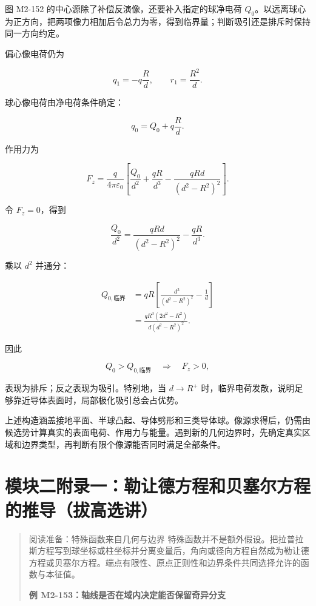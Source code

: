 图 M2-152 的中心源除了补偿反演像，还要补入指定的球净电荷
\(Q_0\)。以远离球心为正方向，把两项像力相加后令总力为零，得到临界量；判断吸引还是排斥时保持同一方向约定。

偏心像电荷仍为

\[
q_1=-q\frac{R}{d},
\qquad
r_1=\frac{R^2}{d}.
\]

球心像电荷由净电荷条件确定：

\[
q_0=Q_0+q\frac{R}{d}.
\]

作用力为

\[
F_z
=\frac{q}{4\pi\varepsilon_0}
\left[
\frac{Q_0}{d^2}
+\frac{qR}{d^3}
-\frac{qRd}{(d^2-R^2)^2}
\right].
\]

令 \(F_z=0\)，得到

\[
\frac{Q_0}{d^2}
=\frac{qRd}{(d^2-R^2)^2}
-\frac{qR}{d^3}.
\]

乘以 \(d^2\) 并通分：

\[
\begin{aligned}
Q_{0,\text{临界}}
&=qR\left[
\frac{d^3}{(d^2-R^2)^2}-\frac1d
\right]\\
&=\boxed{
\frac{qR^3(2d^2-R^2)}{d(d^2-R^2)^2}
}.
\end{aligned}
\]

因此

\[
Q_0>Q_{0,\text{临界}}
\quad\Longrightarrow\quad
F_z>0,
\]

表现为排斥；反之表现为吸引。特别地，当 \(d\to R^+\)
时，临界电荷发散，说明足够靠近导体表面时，局部极化吸引总会占优势。

上述构造涵盖接地平面、半球凸起、导体劈形和三类导体球。像源求得后，仍需由候选势计算真实的表面电荷、作用力与能量。遇到新的几何边界时，先确定真实区域和边界类型，再判断有限个像源能否同时满足全部条件。

\section{模块二附录一：勒让德方程和贝塞尔方程的推导（拔高选讲）}\label{m2:ux6a21ux5757ux4e8cux9644ux5f55ux4e00ux52d2ux8ba9ux5fb7ux65b9ux7a0bux548cux8d1dux585eux5c14ux65b9ux7a0bux7684ux63a8ux5bfcux62d4ux9ad8ux9009ux8bb2}

\begin{quote}
阅读准备：特殊函数来自几何与边界
特殊函数并不是额外假设。把拉普拉斯方程写到球坐标或柱坐标并分离变量后，角向或径向方程自然成为勒让德方程或贝塞尔方程。端点有限性、原点正则性和边界条件共同选择允许的函数与本征值。

\textbf{例 M2-153：轴线是否在域内决定能否保留奇异分支}
\end{quote}

